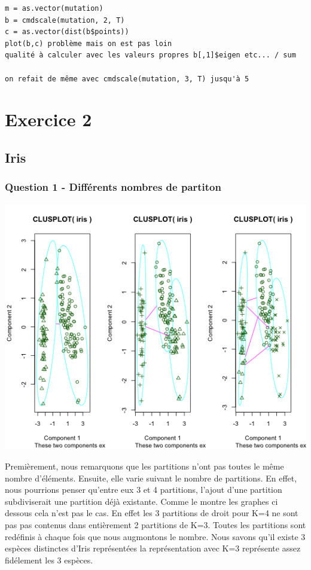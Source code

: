 \documentclass{article}\usepackage[]{graphicx}\usepackage[]{color}
\begin{document}
\begin{verbatim}
m = as.vector(mutation)
b = cmdscale(mutation, 2, T)
c = as.vector(dist(b$points))
plot(b,c) problème mais on est pas loin 
qualité à calculer avec les valeurs propres b[,1]$eigen etc... / sum 

on refait de même avec cmdscale(mutation, 3, T) jusqu'à 5 

\end{verbatim}

\section*{Exercice 2} 

\subsection*{Iris}


\subsubsection*{Question 1 - Différents nombres de partiton}

\includegraphics[width=\textwidth]{ex2_iris_1.png}


Premièrement, nous remarquons que les partitions n'ont pas toutes le même nombre d'éléments. 
Ensuite, elle varie suivant le nombre de partitions. En effet, nous pourrions penser qu'entre eux 3 et 4 partitions, l'ajout d'une partition subdiviserait une partition déjà existante. Comme le montre les graphes ci dessous cela n'est pas le cas. En effet les 3 partitions de droit pour K=4 ne sont pas pas contenus dans entièrement 2 partitions de K=3. Toutes les partitions sont redéfinis à chaque fois que nous augmontons le nombre. 
Nous savons qu'il existe 3 espèces distinctes d'Iris représentées la représentation avec K=3 représente assez fidélement les 3 espèces. 
\end{document}
